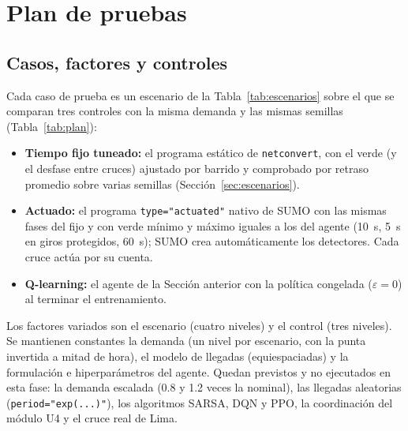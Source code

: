 \section{Plan de pruebas}
\label{sec:plan}

\subsection*{Casos, factores y controles}

Cada caso de prueba es un escenario de la Tabla~\ref{tab:escenarios}
sobre el que se comparan tres controles con la misma demanda y las
mismas semillas (Tabla~\ref{tab:plan}):

\begin{itemize}
  \item \textbf{Tiempo fijo tuneado:} el programa estático de
    \texttt{netconvert}, con el verde (y el desfase entre cruces)
    ajustado por barrido y comprobado por retraso promedio sobre varias
    semillas (Sección~\ref{sec:escenarios}).
  \item \textbf{Actuado:} el programa \verb|type="actuated"| nativo de
    SUMO con las mismas fases del fijo y con verde mínimo y máximo
    iguales a los del agente (10~s, 5~s en giros protegidos, 60~s); SUMO
    crea automáticamente los detectores. Cada cruce actúa por su cuenta.
  \item \textbf{Q-learning:} el agente de la Sección anterior con la
    política congelada ($\varepsilon = 0$) al terminar el entrenamiento.
\end{itemize}

Los factores variados son el escenario (cuatro niveles) y el control
(tres niveles). Se mantienen constantes la demanda (un nivel por
escenario, con la punta invertida a mitad de hora), el modelo de
llegadas (equiespaciadas) y la formulación e hiperparámetros del
agente. Quedan previstos y no ejecutados en esta fase: la demanda
escalada (0.8 y 1.2 veces la nominal), las llegadas aleatorias
(\verb|period="exp(...)"|), los algoritmos SARSA, DQN y PPO, la
coordinación del módulo U4 y el cruce real de Lima.

